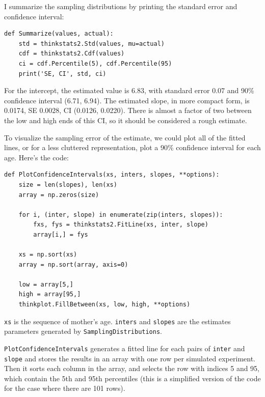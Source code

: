 \documentclass[12pt]{book}
\begin{document}
I summarize the sampling distributions by printing the standard
error and confidence interval:

\begin{verbatim}
def Summarize(values, actual):
    std = thinkstats2.Std(values, mu=actual)
    cdf = thinkstats2.Cdf(values)
    ci = cdf.Percentile(5), cdf.Percentile(95)
    print('SE, CI', std, ci)
\end{verbatim}

For the intercept, the estimated value is 6.83, with standard error
0.07 and 90\% confidence interval (6.71, 6.94).  The estimated slope, in
more compact form, is 0.0174, SE 0.0028, CI (0.0126, 0.0220).
There is almost a factor of two between the low and high ends of
this CI, so it should be considered a rough estimate.


To visualize the sampling error of the estimate, we could plot
all of the fitted lines, or for a less cluttered representation,
plot a 90\% confidence interval for each age.  Here's the code:

\begin{verbatim}
def PlotConfidenceIntervals(xs, inters, slopes, **options):
    size = len(slopes), len(xs)
    array = np.zeros(size)

    for i, (inter, slope) in enumerate(zip(inters, slopes)):
        fxs, fys = thinkstats2.FitLine(xs, inter, slope)
        array[i,] = fys

    xs = np.sort(xs)
    array = np.sort(array, axis=0)
    
    low = array[5,]
    high = array[95,]
    thinkplot.FillBetween(xs, low, high, **options)
\end{verbatim}

{\tt xs} is the sequence of mother's age.  {\tt inters} and {\tt slopes}
are the estimates parameters generated by {\tt SamplingDistributions}.

{\tt PlotConfidenceIntervals} generates a fitted line for each pairs
of {\tt inter} and {\tt slope} and stores the results in an array with
one row per simulated experiment.  Then it sorts each column in the
array, and selects the row with indices 5 and 95, which contain the
5th and 95th percentiles (this is a simplified version of the code for
the case where there are 101 rows).
\end{document}
